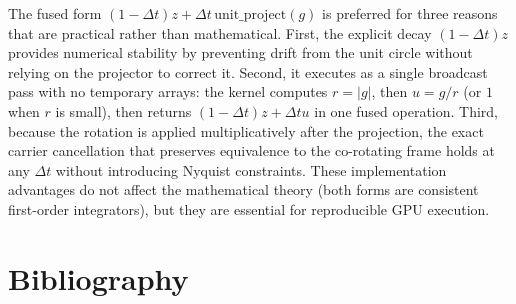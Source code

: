 \documentclass[11pt]{article}
\newcommand{\dt}{\Delta t}
\newcommand{\unitproject}{\mathrm{unit\_project}}
\begin{document}
The fused form $(1-\dt)z + \dt\,\unitproject(g)$ is preferred for three reasons that are practical rather than mathematical. First, the explicit decay $(1-\dt)z$ provides numerical stability by preventing drift from the unit circle without relying on the projector to correct it. Second, it executes as a single broadcast pass with no temporary arrays: the kernel computes $r = |g|$, then $u = g/r$ (or $1$ when $r$ is small), then returns $(1-\dt)z + \dt u$ in one fused operation. Third, because the rotation is applied multiplicatively after the projection, the exact carrier cancellation that preserves equivalence to the co-rotating frame holds at any $\dt$ without introducing Nyquist constraints. These implementation advantages do not affect the mathematical theory (both forms are consistent first-order integrators), but they are essential for reproducible GPU execution.

\appendix
\section{Bibliography}\label{sec:bibliography}



\end{document}
